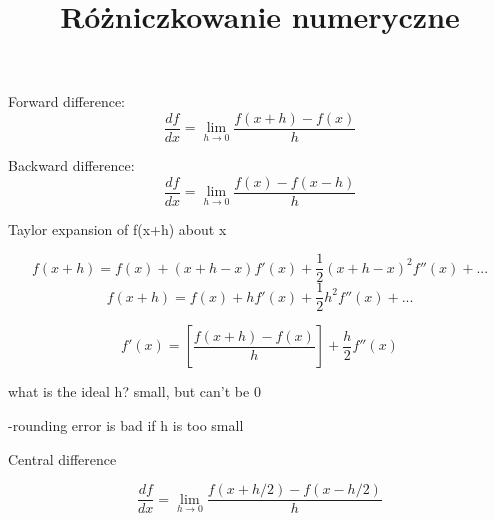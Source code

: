 \documentclass{article}
\title{Różniczkowanie numeryczne}
\begin{document}
  \maketitle
  \newpage

Forward difference:
$$\frac{df}{dx} = \lim_{h \rightarrow 0} \frac{f(x+h)-f(x)}{h}$$

Backward difference:
$$\frac{df}{dx} = \lim_{h \rightarrow 0} \frac{f(x)-f(x-h)}{h}$$

Taylor expansion of f(x+h) about x

$$f(x+h) = f(x) + (x+h-x)f'(x) + \frac{1}{2}(x+h-x)^2f''(x) + ...$$
$$f(x+h) = f(x) + hf'(x) + \frac{1}{2}h^2f''(x) + ...$$

$$f'(x) = [\frac{f(x+h)-f(x)}{h}] + \frac{h}{2}f''(x)$$

what is the ideal h?
small, but can't be 0

-rounding error is bad if h is too small

\newpage

Central difference

$$\frac{df}{dx} = \lim_{h \rightarrow 0} \frac{f(x+h/2)-f(x-h/2)}{h}$$
\end{document}
